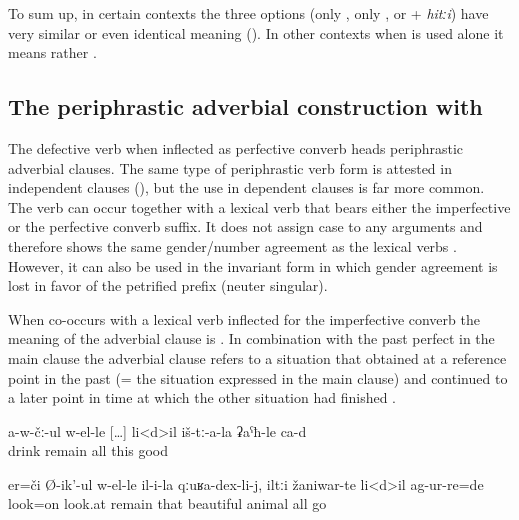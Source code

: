 To sum up, in certain contexts the three options (only , only , or  + \textit{hitːi}) have very similar or even identical meaning (). In other contexts when  is used alone it means rather .



\subsection{The periphrastic adverbial construction with  }
\label{sec:periphrastic adverbial construction belle}

The defective verb   when inflected as perfective converb heads periphrastic adverbial clauses. The same type of periphrastic verb form is attested in independent clauses (), but the use in dependent clauses is far more common. The verb can occur together with a lexical verb that bears either the imperfective or the perfective converb suffix. It does not assign case to any arguments and therefore shows the same gender/number agreement as the lexical verbs . However, it can also be used in the invariant form   in which gender agreement is lost in favor of the petrified prefix  (neuter singular).

When  co-occurs with a lexical verb inflected for the imperfective converb the meaning of the adverbial clause is  . In combination with the past perfect in the main clause the adverbial clause refers to a situation that obtained at a reference point in the past (= the situation expressed in the main clause) and continued to a later point in time at which the other situation had finished .
%
\begin{exe}
	\ex	\label{ex:‎While until / as long as he is not drinking, everything is good for them}
	\gll	a-w-čː-ul	w-el-le	[\ldots]	li<d>il	iš-tː-a-la	ʡaˁħ-le	ca-d\\
		drink	remain	{}	all	this	good	\\
	\glt	{}

	\ex	\label{ex:‎‎‎The poor man took the stone}
	\gll	er=či	Ø-ik'-ul	w-el-le	il-i-la	qːuʁa-dex-li-j,	iltːi	žaniwar-te	li<d>il	ag-ur-re=de\\
		look=on	look.at	remain	that	beautiful		animal	all	go\\
	\glt	{}
\end{exe}

